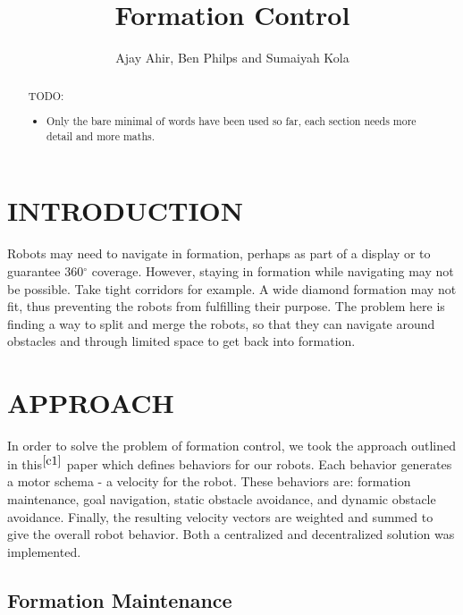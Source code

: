 \documentclass[letterpaper, 10 pt, conference]{ieeeconf}  %
\title{\LARGE \bf Formation Control}
\author{Ajay Ahir, Ben Philps and Sumaiyah Kola}
\begin{document}
\maketitle
\thispagestyle{empty}
\pagestyle{empty}

\begin{abstract}

TODO:

\begin{itemize}
\item Only the bare minimal of words have been used so far, each section needs more detail and more maths.
\end{itemize}

\end{abstract}

\section{INTRODUCTION}

Robots may need to navigate in formation, perhaps as part of a display or to guarantee 360$^{\circ}$ coverage. However, staying in formation while navigating may not be possible. Take tight corridors for example. A wide diamond formation may not fit, thus preventing the robots from fulfilling their purpose. The problem here is finding a way to split and merge the robots, so that they can navigate around obstacles and through limited space to get back into formation.

\section{APPROACH}

In order to solve the problem of formation control, we took the approach outlined in this$^{\cite{c1}}$ paper which defines behaviors for our robots. Each behavior generates a motor schema - a velocity for the robot. These behaviors are: formation maintenance, goal navigation, static obstacle avoidance, and dynamic obstacle avoidance. Finally, the resulting velocity vectors are weighted and summed to give the overall robot behavior. Both a centralized and decentralized solution was implemented.

\subsection{Formation Maintenance}
\end{document}
